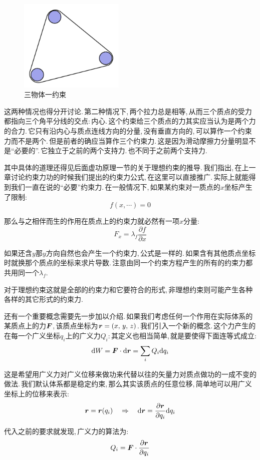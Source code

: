 \begin{figure}
\centering
\includegraphics[width=5cm]{image/6-2-4.png}
\caption{三物体一约束}
\end{figure}
这两种情况也得分开讨论.\,第二种情况下,\,两个拉力总是相等,\,从而三个质点的受力都指向三个角平分线的交点:\,内心.\,这个约束给三个质点的力其实应当认为是两个力的合力.\,它只有沿内心与质点连线方向的分量,\,没有垂直方向的,\,可以算作一个约束力而不是两个.\,但是前者的确应当算作三个约束力.\,这是因为滑动摩擦力分量明显不是``必要的''.\,它独立于之前的两个支持力.\,也不同于之前两个支持力.

其中具体的道理还得见后面虚功原理一节的关于理想约束的推导.\,我们指出,\,在上一章讨论约束力功的时候我们提出的约束力公式,\,在这里可以直接推广.\,实际上就能得到我们一直在说的``必要''约束力.\,在一般情况下,\,如果某约束对一质点的$x$坐标产生了限制:
\[f(x,\cdots)=0\]

那么与之相伴而生的作用在质点上的约束力就必然有一项$x$分量:
\[F_x=\lambda_f\frac{\partial f}{\partial x}\]

如果还含$y$那$y$方向自然也会产生一个约束力,\,公式是一样的.\,如果含有其他质点坐标时就换那个质点的坐标来求片导数.\,注意由同一个约束方程产生的所有的约束力都共用同一个$\lambda_f$.

对于理想约束这就是全部的约束力和它要符合的形式,\,非理想约束则可能产生各种各样的其它形式的约束力.

还有一个重要概念需要先一步加以介绍.\,如果我们考虑任何一个作用在实际体系的某质点上的力$\boldsymbol{F}$,\,该质点坐标为$\boldsymbol{r}=(x,\,y,\,z)$.\,我们引入一个新的概念.\,这个力产生的在每一个广义坐标$q_i$上的广义力$Q_i$:\,其定义也相当简单,\,就是要使得下面连等式成立:
\[\textrm{d} W=\boldsymbol{F}\cdot \textrm{d} \boldsymbol{r}=\sum_i Q_i\textrm{d} q_i\]

这是希望用广义力对广义位移来做功来代替以往的矢量力对质点做功的一成不变的做法.\,我们默认体系都是稳定约束,\,那么其实该质点的任意位移,\,简单地可以用广义坐标上的位移来表示:
\[\boldsymbol{r}=\boldsymbol{r}(q_i)\quad \Rightarrow \quad \textrm{d} \boldsymbol{r}=\frac{\partial \boldsymbol{r}}{\partial q_i}\textrm{d} q_i\]

代入之前的要求就发现,\,广义力的算法为:
\[Q_i=\boldsymbol{F}\cdot\frac{\partial \boldsymbol{r}}{\partial q_i}\]
\vspace{0.5cm}

